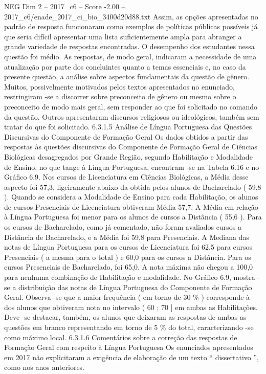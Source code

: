 \begin{textsample}{NEG Dim 2 – 2017\_c6 – Score -2.00 – 2017\_c6/enade\_2017\_ci\_bio\_3400d20d88.txt}
Assim, as opções apresentadas no padrão de resposta funcionaram como exemplos de políticas públicas possíveis já que seria difícil apresentar uma lista suficientemente ampla para abranger a grande variedade de respostas encontradas.
O desempenho dos estudantes nessa questão foi médio.
As respostas, de modo geral, indicaram a necessidade de uma atualização por parte dos concluintes quanto a temas essenciais e, no caso da presente questão, a análise sobre aspectos fundamentais da questão de gênero.
Muitos, possivelmente motivados pelos textos apresentados no enunciado, restringiram -se a discorrer sobre preconceito de gênero ou mesmo sobre o preconceito de modo mais geral, sem responder ao que foi solicitado no comando da questão.
Outros apresentaram discursos religiosos ou ideológicos, também sem tratar do que foi solicitado. 6.3.1.5 Análise de Língua Portuguesa das Questões Discursivas do Componente de Formação Geral Os dados obtidos a partir das respostas às questões discursivas do Componente de Formação Geral de Ciências Biológicas desagregados por Grande Região, segundo Habilitação e Modalidade de Ensino, no que tange à Língua Portuguesa, encontram -se na Tabela 6.16 e no Gráfico 6.9.
Nos cursos de Licenciatura em Ciências Biológicas, a Média desse aspecto foi 57,3, ligeiramente abaixo da obtida pelos alunos de Bacharelado ( 59,8 ).
Quando se considera a Modalidade de Ensino para cada Habilitação, os alunos de cursos Presenciais de Licenciatura obtiveram Média 57,7.
A Média em relação à Língua Portuguesa foi menor para os alunos de cursos a Distância ( 55,6 ).
Para os cursos de Bacharelado, como já comentado, não foram avaliados cursos a Distância de Bacharelado, e a Média foi 59,8 para Presenciais.
A Mediana das notas de Língua Portuguesa para os cursos de Licenciatura foi 62,5 para cursos Presenciais ( a mesma para o total ) e 60,0 para os cursos a Distância.
Para os cursos Presenciais de Bacharelado, foi 65,0.
A nota máxima não chegou a 100,0 para nenhuma combinação de Habilitação e modalidade.
No Gráfico 6.9, mostra -se a distribuição das notas de Língua Portuguesa do Componente de Formação Geral.
Observa -se que a maior frequência ( em torno de 30 \% ) corresponde à dos alunos que obtiveram nota no intervalo ( 60 ; 70 ] em ambas as Habilitações.
Deve -se destacar, também, os alunos que deixaram as respostas de ambas as questões em branco representando em torno de 5 \% do total, caracterizando -se como máximo local. 6.3.1.6 Comentários sobre a correção das respostas de Formação Geral com respeito à Língua Portuguesa Os enunciados apresentados em 2017 não explicitaram a exigência de elaboração de um texto “ dissertativo ”, como nos anos anteriores.

\end{textsample}
